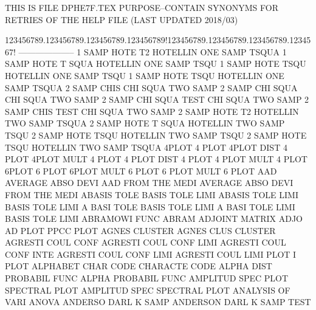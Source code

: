 THIS IS FILE DPHE7F.TEX
PURPOSE--CONTAIN SYNONYMS FOR RETRIES OF THE HELP FILE (LAST UPDATED 2018/03)
 
123456789.123456789.123456789.123456789!123456789.123456789.123456789.1234567!
--------------------
1        SAMP HOTE T2                   HOTELLIN ONE  SAMP TSQUA
1        SAMP HOTE T    SQUA            HOTELLIN ONE  SAMP TSQU
1        SAMP HOTE TSQU                 HOTELLIN ONE  SAMP TSQU
1        SAMP HOTE TSQU                 HOTELLIN ONE  SAMP TSQUA
2        SAMP CHIS                      CHI      SQUA TWO  SAMP
2        SAMP CHI  SQUA                 CHI      SQUA TWO  SAMP
2        SAMP CHI  SQUA TEST            CHI      SQUA TWO  SAMP
2        SAMP CHIS TEST                 CHI      SQUA TWO  SAMP
2        SAMP HOTE T2                   HOTELLIN TWO  SAMP TSQUA
2        SAMP HOTE T    SQUA            HOTELLIN TWO  SAMP TSQU
2        SAMP HOTE TSQU                 HOTELLIN TWO  SAMP TSQU
2        SAMP HOTE TSQU                 HOTELLIN TWO  SAMP TSQUA
4PLOT                                   4        PLOT
4PLOT    DIST                           4        PLOT
4PLOT    MULT                           4        PLOT
4        PLOT DIST                      4        PLOT
4        PLOT MULT                      4        PLOT
6PLOT                                   6        PLOT
6PLOT    MULT                           6        PLOT
6        PLOT MULT                      6        PLOT
AAD                                     AVERAGE  ABSO DEVI
AAD      FROM THE  MEDI                 AVERAGE  ABSO DEVI FROM THE  MEDI
ABASIS   TOLE                           BASIS    TOLE LIMI
ABASIS   TOLE LIMI                      BASIS    TOLE LIMI
A        BASI TOLE                      BASIS    TOLE LIMI
A        BASI TOLE LIMI                 BASIS    TOLE LIMI
ABRAMOWI FUNC                           ABRAM
ADJOINT                                 MATRIX   ADJO
AD       PLOT                           PPCC     PLOT
AGNES                                   CLUSTER
AGNES    CLUS                           CLUSTER
AGRESTI  COUL CONF                      AGRESTI  COUL CONF LIMI
AGRESTI  COUL CONF INTE                 AGRESTI  COUL CONF LIMI
AGRESTI  COUL LIMI PLOT                 I        PLOT
ALPHABET CHAR CODE                      CHARACTE CODE
ALPHA    DIST                           PROBABIL FUNC
ALPHA                                   PROBABIL FUNC
AMPLITUD SPEC PLOT                      SPECTRAL PLOT
AMPLITUD SPEC                           SPECTRAL PLOT
ANALYSIS OF   VARI                      ANOVA
ANDERSO  DARL K    SAMP                 ANDERSON DARL K    SAMP TEST

